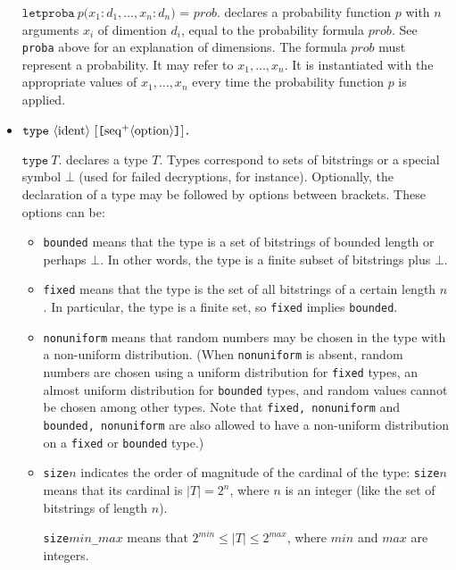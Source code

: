 \begin{itemize}
$\texttt{letproba}\ p\texttt{(}x_1:d_1, \dots, x_n:d_n\texttt{) = }\mathit{prob}\texttt{.}$ declares a probability function $p$ with $n$ arguments $x_i$ of dimention $d_i$, equal to the probability formula $\mathit{prob}$. See \texttt{proba} above for an explanation of dimensions. The formula $\mathit{prob}$ must represent a probability. It may refer to $x_1, \dots, x_n$. It is instantiated with the appropriate values of $x_1, \dots, x_n$ every time the probability function $p$ is applied.

\item $\texttt{type}\ \nonterm{ident}\ [\texttt{[}\neseq{option}\texttt{]}]\texttt{.}$

$\texttt{type}\ T\texttt{.}$ declares a type $T$. Types correspond to sets
of bitstrings or a special symbol $\bot$ (used for failed decryptions, 
for instance). Optionally, the declaration of a type may be followed by options
between brackets. These options can be:
\begin{itemize}

\item \texttt{bounded} means that the type is a set of bitstrings of
bounded length or perhaps $\bot$. In other words, the type is a finite
subset of bitstrings plus $\bot$.

\item \texttt{fixed} means that the type is the set of all bitstrings of 
a certain length $n$. In particular, the type is a finite set,
so \texttt{fixed} implies \texttt{bounded}. 

\item \texttt{nonuniform} means that random numbers may be chosen in
  the type with a non-uniform distribution. (When \texttt{nonuniform}
  is absent, random numbers are chosen using a uniform distribution
  for {\tt fixed} types, an almost uniform distribution for
  \texttt{bounded} types, and random values cannot be chosen among
  other types. Note that \texttt{fixed, nonuniform} and
  \texttt{bounded, nonuniform} are also allowed to have a non-uniform
  distribution on a \texttt{fixed} or \texttt{bounded} type.)

\item \texttt{size$n$} indicates
the order of magnitude of the cardinal of the type:
\texttt{size$n$} means that its cardinal is $|T| = 2^n$,
where $n$ is an integer
(like the set of bitstrings of length $n$).

\texttt{size$\mathit{min}$\_$\mathit{max}$} means that  $2^{\mathit{min}} \leq |T| \leq 2^{\mathit{max}}$, where $\mathit{min}$ and $\mathit{max}$ are integers.


\end{itemize}
\end{itemize}
